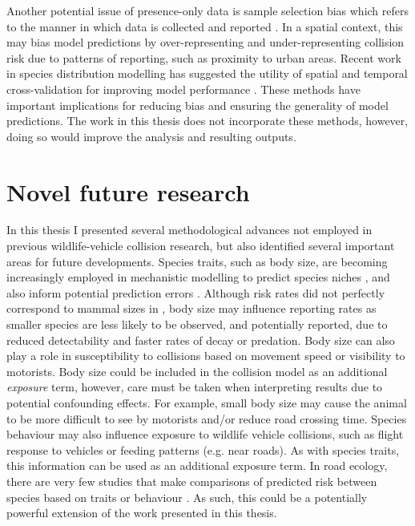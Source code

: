 Another potential issue of presence-only data is sample selection bias which refers to the manner in which data is collected and reported \citep{phil09}. In a spatial context, this may bias model predictions by over-representing and under-representing collision risk due to patterns of reporting, such as proximity to urban areas. Recent work in species distribution modelling has suggested the utility of spatial and temporal cross-validation for improving model performance \citep{weng12,robe17}. These methods have important implications for reducing bias and ensuring the generality of model predictions. The work in this thesis does not incorporate these methods, however, doing so would improve the analysis and resulting outputs.\vfill

\section{Novel future research}

In this thesis I presented several methodological advances not employed in previous wildlife-vehicle collision research, but also identified several important areas for future developments. Species traits, such as body size, are becoming increasingly employed in mechanistic modelling to predict species niches \citep{kear09}, and also  inform potential prediction errors \citep[e.g.][]{seoa05}. Although risk rates did not perfectly correspond to mammal sizes in , body size may influence reporting rates as smaller species are less likely to be observed, and potentially reported, due to reduced detectability and faster rates of decay or predation. Body size can also play a role in susceptibility to collisions based on movement speed \citep{jaar06} or visibility to motorists. Body size could be included in the collision model as an additional \textit{exposure} term, however, care must be taken when interpreting results due to potential confounding effects. For example, small body size may cause the animal to be more difficult to see by motorists and/or reduce road crossing time. Species behaviour may also influence exposure to wildlife vehicle collisions, such as flight response to vehicles \citep{deva14,lee10} or feeding patterns (e.g. near roads). As with species traits, this information can be used as an additional exposure term. In road ecology, there are very few studies that make comparisons of predicted risk between species based on traits or behaviour \citep[but see][]{litv08}. As such, this could be a potentially powerful extension of the work presented in this thesis. 

